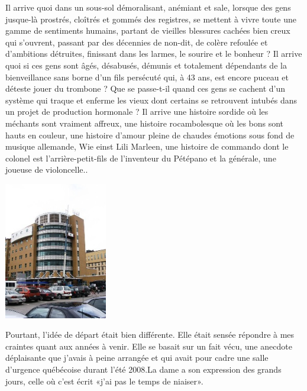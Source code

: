 


Il arrive quoi dans un sous-sol démoralisant, anémiant et sale, lorsque des gens jusque-là prostrés, cloîtrés et gommés des registres, se mettent à vivre toute une gamme de sentiments humains, partant de vieilles blessures cachées bien creux qui s’ouvrent, passant par des décennies de non-dit, de colère refoulée et d’ambitions détruites, finissant dans les larmes, le sourire et le bonheur ? Il arrive quoi si ces gens sont âgés, désabusés, démunis et totalement dépendants de la bienveillance sans borne d’un fils persécuté qui, à 43 ans, est encore puceau et déteste jouer du trombone ? Que se passe-t-il quand ces gens se cachent d’un système qui traque et enferme les vieux dont certains se retrouvent intubés dans un projet de production hormonale ? Il arrive une histoire sordide où les méchants sont vraiment affreux, une histoire rocambolesque où les bons sont hauts en couleur, une histoire d’amour pleine de chaudes émotions sous fond de musique allemande, Wie einst Lili Marleen, une histoire de commando dont le colonel est l’arrière-petit-fils de l’inventeur du Pétépano et la générale, une joueuse de violoncelle..

\begin{floatingfigure}[r]{40mm}
\includegraphics[height=60mm]{intro/preface/img/hopital.jpg}
\end{floatingfigure}

Pourtant, l’idée de départ était bien différente. Elle était sensée répondre à mes craintes quant aux années à venir. Elle se basait sur un fait vécu, une anecdote déplaisante que j’avais à peine arrangée et qui avait pour cadre une salle d’urgence québécoise durant l’été 2008.La dame a son expression des grands jours, celle où c’est écrit «j’ai pas le temps de niaiser».


